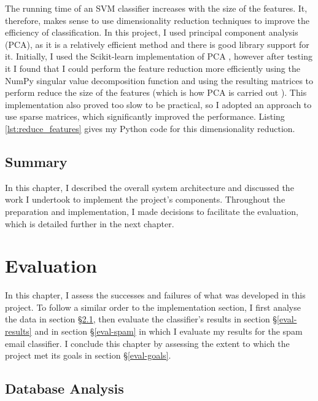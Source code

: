 \documentclass[12pt,a4paper,twoside,openright]{report}
\newcommand{\mylisting}[4]{}
\newcommand{\pylisting}[2]{\mylisting{Python}{py}{#1}{#2}}
\begin{document}
The running time of an SVM classifier increases with the size of the features. It, therefore, makes sense to use dimensionality reduction techniques to improve the efficiency of classification. In this project, I used principal component analysis (PCA), as it is a relatively efficient method and there is good library support for it. Initially, I used the Scikit-learn implementation of PCA \cite{sklearnpca}, however after testing it I found that I could perform the feature reduction more efficiently using the NumPy singular value decomposition function \cite{numpysvd} and using the resulting matrices to perform reduce the size of the features (which is how PCA is carried out \cite{svd}). This implementation also proved too slow to be practical, so I adopted an approach to use sparse matrices, which significantly improved the performance. Listing \ref{lst:reduce_features} gives my Python code for this dimensionality reduction.

\pylisting{A function using NumPy array operations to perform singular value decomposition on two sets of given features}{reduce_features}

\section{Summary}

In this chapter, I described the overall system architecture and discussed the work I undertook to implement the project's components. Throughout the preparation and implementation, I made decisions to facilitate the evaluation, which is detailed further in the next chapter.

\chapter{Evaluation} \label{eval}

In this chapter, I assess the successes and failures of what was developed in this project. To follow a similar order to the implementation section, I first analyse the data in section \S\ref{eval-database}, then evaluate the classifier's results in section \S\ref{eval-results} and in section \S\ref{eval-spam} in which I evaluate my results for the spam email classifier. I conclude this chapter by assessing the extent to which the project met its goals in section \S\ref{eval-goals}.

\section{Database Analysis} \label{eval-database}
\end{document}
